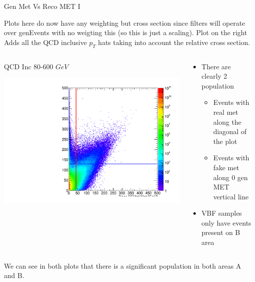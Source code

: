 \documentclass[8pt]{beamer}
\begin{document}
\begin{frame}{Gen Met Vs Reco MET I}

Plots here do now have any weighting but cross section since filters will operate over genEvents with no weigting this (so this is just a scaling).
Plot on the right Adds all the QCD inclusive $p_T$ hats taking into account the relative cross section.

\begin{columns}

\begin{block}{QCD Inc 80-600 $GeV$}
 
\includegraphics[width=\linewidth]{img/MC_QCDIncAll_GenVsReco_met}
 
\end{block}

\begin{block}

\begin{itemize}
  \item There are clearly 2 population
  \begin{itemize}
    \item Events with real met along the diagonal of the plot
    \item Events with fake met along 0 gen MET vertical line
  \end{itemize}
  \item VBF samples only have events present on B area
\end{itemize}
 
\end{block}

\end{columns}

We can see in both plots that there is a significant population in both areas A and B.

\end{frame}
\end{document}
